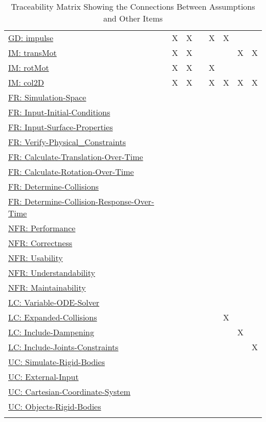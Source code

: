 \documentclass[12pt]{article}
\begin{document}
\begin{longtable}{l l l l l l l l}
\\
\hyperref[GD:impulse]{GD: impulse} & X & X &  & X & X &  & 
\\
\hyperref[IM:transMot]{IM: transMot} & X & X &  &  &  & X & X
\\
\hyperref[IM:rotMot]{IM: rotMot} & X & X &  & X &  &  & 
\\
\hyperref[IM:col2D]{IM: col2D} & X & X &  & X & X & X & X
\\
\hyperref[simSpace]{FR: Simulation-Space} &  &  &  &  &  &  & 
\\
\hyperref[inputInitialConds]{FR: Input-Initial-Conditions} &  &  &  &  &  &  & 
\\
\hyperref[inputSurfaceProps]{FR: Input-Surface-Properties} &  &  &  &  &  &  & 
\\
\hyperref[verifyPhysCons]{FR: Verify-Physical\_Constraints} &  &  &  &  &  &  & 
\\
\hyperref[calcTransOverTime]{FR: Calculate-Translation-Over-Time} &  &  &  &  &  &  & 
\\
\hyperref[calcRotOverTime]{FR: Calculate-Rotation-Over-Time} &  &  &  &  &  &  & 
\\
\hyperref[deterColls]{FR: Determine-Collisions} &  &  &  &  &  &  & 
\\
\hyperref[deterCollRespOverTime]{FR: Determine-Collision-Response-Over-Time} &  &  &  &  &  &  & 
\\
\hyperref[performance]{NFR: Performance} &  &  &  &  &  &  & 
\\
\hyperref[correctness]{NFR: Correctness} &  &  &  &  &  &  & 
\\
\hyperref[usability]{NFR: Usability} &  &  &  &  &  &  & 
\\
\hyperref[understandability]{NFR: Understandability} &  &  &  &  &  &  & 
\\
\hyperref[maintainability]{NFR: Maintainability} &  &  &  &  &  &  & 
\\
\hyperref[lcVODES]{LC: Variable-ODE-Solver} &  &  &  &  &  &  & 
\\
\hyperref[lcEC]{LC: Expanded-Collisions} &  &  &  &  & X &  & 
\\
\hyperref[lcID]{LC: Include-Dampening} &  &  &  &  &  & X & 
\\
\hyperref[lcIJC]{LC: Include-Joints-Constraints} &  &  &  &  &  &  & X
\\
\hyperref[ucSRB]{UC: Simulate-Rigid-Bodies} &  &  &  &  &  &  & 
\\
\hyperref[ucEI]{UC: External-Input} &  &  &  &  &  &  & 
\\
\hyperref[ucCCS]{UC: Cartesian-Coordinate-System} &  &  &  &  &  &  & 
\\
\hyperref[ucORB]{UC: Objects-Rigid-Bodies} &  &  &  &  &  &  & 
\\
\bottomrule
\caption{Traceability Matrix Showing the Connections Between Assumptions and Other Items}
\label{Table:TraceMatAvsAll}
\end{longtable}
\end{document}
